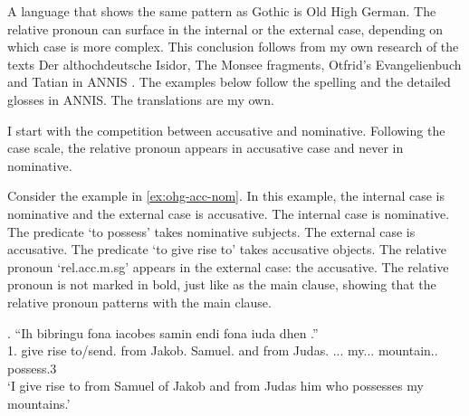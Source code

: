 %
%


A language that shows the same pattern as Gothic is Old High German. The relative pronoun can surface in the internal or the external case, depending on which case is more complex. This conclusion follows from my own research of the texts Der althochdeutsche Isidor, The Monsee fragments, Otfrid's Evangelienbuch and Tatian in ANNIS \citep{krause2016}. The examples below follow the spelling and the detailed glosses in ANNIS. The translations are my own.

I start with the competition between accusative and nominative. Following the case scale, the relative pronoun appears in accusative case and never in nominative.

Consider the example in \ref{ex:ohg-acc-nom}. In this example, the internal case is nominative and the external case is accusative.
The internal case is nominative. The predicate  `to possess' takes nominative subjects.
The external case is accusative. The predicate  `to give rise to' takes accusative objects.
The relative pronoun  `\ac{rel}.\ac{acc}.\ac{m}.\ac{sg}' appears in the external case: the accusative. The relative pronoun is not marked in bold, just like as the main clause, showing that the relative pronoun patterns with the main clause.


\exg. ``Ih bibringu fona iacobes samin endi fona iuda dhen   .''\\
1. {give rise to/send}.\scsub{[acc]} from Jakob. Samuel. and from Judas. ... my... mountain.. possess.3\scsub{[nom]}\\
`I give rise to from Samuel of Jakob and from Judas him who possesses my mountains.' \label{ex:ohg-acc-nom}\\

